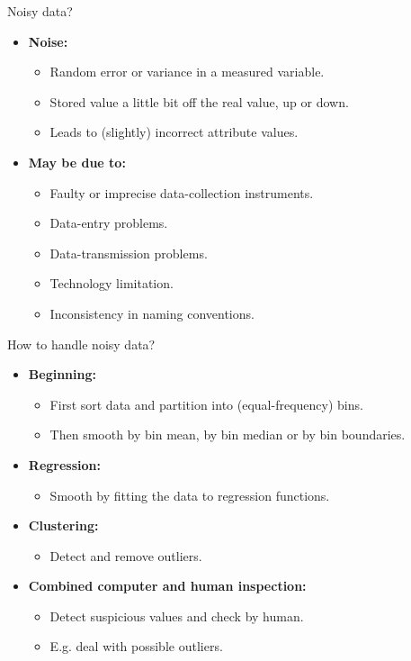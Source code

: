 \documentclass[aspectratio=169,t]{beamer}
\begin{document}
  { 
    \begin{frame}{Noisy data?}
    \begin{itemize}
      \item \textbf{\color{airforceblue}Noise:}
      \begin{itemize}
        \item Random error or variance in a measured variable.
        \item Stored value a little bit off the real value, up or down.
        \item Leads to (slightly) incorrect attribute values.
      \end{itemize}
      \item \textbf{May be due to:}
      \begin{itemize}
        \item Faulty or imprecise data-collection instruments.
        \item Data-entry problems.
        \item Data-transmission problems.
        \item Technology limitation.
        \item Inconsistency in naming conventions.
      \end{itemize}
    \end{itemize}
    \end{frame}
  }

  { 
    \begin{frame}{How to handle noisy data?}
    \begin{itemize}
        \item \textbf{Beginning:}
        \begin{itemize}
          \item First sort data and partition into (equal-frequency) bins.
          \item Then smooth by bin mean, by bin median or by bin boundaries.
        \end{itemize}
        \item \textbf{Regression:}
        \begin{itemize}
          \item Smooth by fitting the data to regression functions.
        \end{itemize}
        \item \textbf{Clustering:}
        \begin{itemize}
          \item Detect and remove outliers.
        \end{itemize}
        \item \textbf{Combined computer and human inspection:}
        \begin{itemize}
          \item Detect suspicious values and check by human.
          \item E.g. deal with possible outliers.
        \end{itemize}
    \end{itemize}
    \end{frame}
  }
\end{document}
